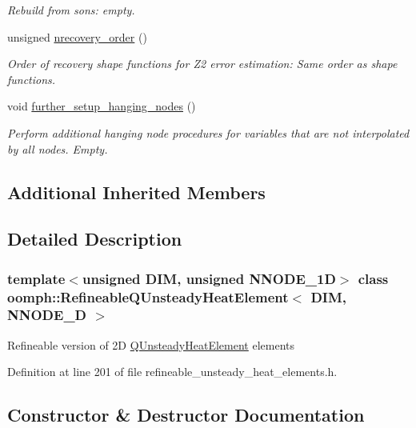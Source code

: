 \begin{DoxyCompactItemize}
\begin{DoxyCompactList}\small\item\em Rebuild from sons\+: empty. \end{DoxyCompactList}\item 
unsigned \hyperlink{classoomph_1_1RefineableQUnsteadyHeatElement_ae216355ba4c445c8d9b46fe4c799c482}{nrecovery\+\_\+order} ()
\begin{DoxyCompactList}\small\item\em Order of recovery shape functions for Z2 error estimation\+: Same order as shape functions. \end{DoxyCompactList}\item 
void \hyperlink{classoomph_1_1RefineableQUnsteadyHeatElement_a4a0c3c617a3b58aaedf71b1e174b607f}{further\+\_\+setup\+\_\+hanging\+\_\+nodes} ()
\begin{DoxyCompactList}\small\item\em Perform additional hanging node procedures for variables that are not interpolated by all nodes. Empty. \end{DoxyCompactList}\end{DoxyCompactItemize}
\subsection*{Additional Inherited Members}


\subsection{Detailed Description}
\subsubsection*{template$<$unsigned D\+IM, unsigned N\+N\+O\+D\+E\+\_\+1D$>$\newline
class oomph\+::\+Refineable\+Q\+Unsteady\+Heat\+Element$<$ D\+I\+M, N\+N\+O\+D\+E\+\_\+D $>$}

Refineable version of 2D \hyperlink{classoomph_1_1QUnsteadyHeatElement}{Q\+Unsteady\+Heat\+Element} elements 

Definition at line 201 of file refineable\+\_\+unsteady\+\_\+heat\+\_\+elements.\+h.



\subsection{Constructor \& Destructor Documentation}
\mbox{\label{classoomph_1_1RefineableQUnsteadyHeatElement_ae1769d1d3f4c15e57c3970b67930fe66}} 
